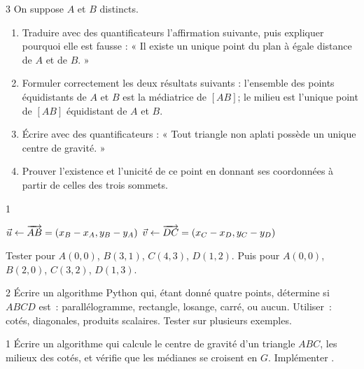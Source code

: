 \begin{bilan}
\begin{exo}{3}
On suppose $A$ et $B$ distincts.
\begin{enumerate}
  \item Traduire avec des quantificateurs l'affirmation suivante, puis expliquer
        pourquoi elle est fausse : « Il existe un unique point du plan à égale
        distance de $A$ et de $B$. »
  \item Formuler correctement les deux résultats suivants :
        l'ensemble des points équidistants de $A$ et $B$ est la médiatrice de
        $[AB]$; le milieu est l'unique point de $[AB]$ équidistant de $A$ et $B$.
  \item Écrire avec des quantificateurs : « Tout triangle non aplati possède un
        unique centre de gravité. »
  \item Prouver l'existence et l'unicité de ce point en donnant ses coordonnées
        à partir de celles des trois sommets.
\end{enumerate}
\end{exo}

\begin{exo}{1}

\begin{algorithm}[H]
\caption{Test de parall\'elogramme}
$\vec{u}\leftarrow\overrightarrow{AB}=(x_B-x_A,y_B-y_A)$\;
$\vec{v}\leftarrow\overrightarrow{DC}=(x_C-x_D,y_C-y_D)$\;
\end{algorithm}

Tester pour $A(0,0)$, $B(3,1)$, $C(4,3)$, $D(1,2)$.
Puis pour $A(0,0)$, $B(2,0)$, $C(3,2)$, $D(1,3)$.
\end{exo}

\begin{exo}{2}
\'Ecrire un algorithme Python qui, \'etant donn\'e quatre points,
d\'etermine si $ABCD$ est~: parall\'elogramme, rectangle, losange, carr\'e, ou aucun.
Utiliser~: cot\'es, diagonales, produits scalaires.
Tester sur plusieurs exemples.
\end{exo}

\begin{exo}{1}
\'Ecrire un algorithme qui calcule le centre de gravité d'un triangle $ABC$,
les milieux des cot\'es, et v\'erifie que les m\'edianes se croisent en $G$.
Impl\'ementer \computer.
\end{exo}


\end{bilan}
